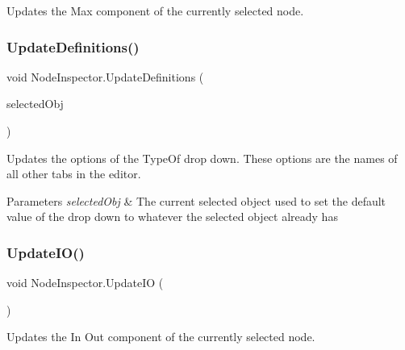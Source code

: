 Updates the Max component of the currently selected node. 

\mbox{\label{class_node_inspector_a652635a29e79966c2819eb20cc8bedc1}} 
\subsubsection{\texorpdfstring{Update\+Definitions()}{UpdateDefinitions()}}
{\footnotesize\ttfamily void Node\+Inspector.\+Update\+Definitions (\begin{DoxyParamCaption}\item[{Game\+Object}]{selected\+Obj }\end{DoxyParamCaption})}



Updates the options of the Type\+Of drop down. These options are the names of all other tabs in the editor. 


\begin{DoxyParams}{Parameters}
{\em selected\+Obj} & The current selected object used to set the default value of the drop down to whatever the selected object already has \\
\hline
\end{DoxyParams}
\mbox{\label{class_node_inspector_a3bf3fdb379bb3ed7acfb3099163538c4}} 
\subsubsection{\texorpdfstring{Update\+I\+O()}{UpdateIO()}}
{\footnotesize\ttfamily void Node\+Inspector.\+Update\+IO (\begin{DoxyParamCaption}{ }\end{DoxyParamCaption})}



Updates the In Out component of the currently selected node. 

\mbox{\label{class_node_inspector_af94d04b7f31d5788591fa21f1c1ed1af}} 

